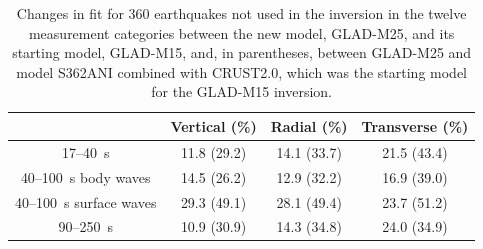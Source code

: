 \begin{table}
  \centering
  \begin{tabular}{|c|c|c|c|}
  \hline
  ~          &  Vertical (\%) & Radial (\%) &  Transverse (\%) \\
  \hline
  17--40~s                &          11.8 (29.2) &       14.1 (33.7) &       21.5 (43.4) \\
  40--100~s body waves    &          14.5 (26.2) &       12.9 (32.2)  &       16.9 (39.0) \\
  40--100~s surface waves &          29.3 (49.1) &       28.1 (49.4) &       23.7 (51.2) \\
  90--250~s               &          10.9 (30.9) &       14.3 (34.8)  &       24.0 (34.9) \\
  \hline
  \end{tabular}\\
  \caption{\small{Changes in fit for 360 earthquakes not used in the inversion in the twelve measurement categories
between the new model, GLAD-M25, and its starting model, GLAD-M15, and, in parentheses, between GLAD-M25 and model S362ANI combined with CRUST2.0, which was the starting model for the GLAD-M15 inversion.}}
  \label{table:misfit_reduction_M15_M25_360}
\end{table}


